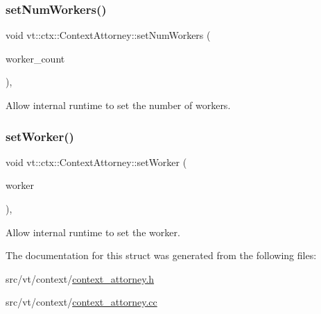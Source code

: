 \subsubsection{\texorpdfstring{set\+Num\+Workers()}{setNumWorkers()}}
{\footnotesize\ttfamily void vt\+::ctx\+::\+Context\+Attorney\+::set\+Num\+Workers (\begin{DoxyParamCaption}\item[{\hyperlink{namespacevt_aa93398ea48f2cb6c188512250f7cc248}{Worker\+Count\+Type} const}]{worker\+\_\+count }\end{DoxyParamCaption})\hspace{0.3cm}{\ttfamily [static]}, {\ttfamily [private]}}



Allow internal runtime to set the number of workers. 

\mbox{\label{structvt_1_1ctx_1_1_context_attorney_aff61a50ec309e8a225504d2f27aa48d4}} 
\subsubsection{\texorpdfstring{set\+Worker()}{setWorker()}}
{\footnotesize\ttfamily void vt\+::ctx\+::\+Context\+Attorney\+::set\+Worker (\begin{DoxyParamCaption}\item[{\hyperlink{namespacevt_a656e362091da17b9b93d0655b36e3392}{Worker\+I\+D\+Type} const}]{worker }\end{DoxyParamCaption})\hspace{0.3cm}{\ttfamily [static]}, {\ttfamily [private]}}



Allow internal runtime to set the worker. 



The documentation for this struct was generated from the following files\+:\begin{DoxyCompactItemize}
\item 
src/vt/context/\hyperlink{context__attorney_8h}{context\+\_\+attorney.\+h}\item 
src/vt/context/\hyperlink{context__attorney_8cc}{context\+\_\+attorney.\+cc}\end{DoxyCompactItemize}
